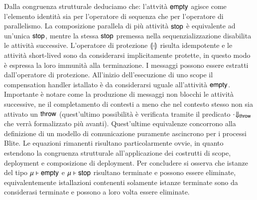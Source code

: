 Dalla congruenza strutturale deduciamo che: l'attvità ${\sf empty}$ agisce come
l'elemento identità sia per l'operatore di sequenza che per l'operatore di
parallelismo. La composizione parallela di più attività ${\sf stop}$ è equivalente ad
un'unica ${\sf stop}$, mentre la stessa ${\sf stop}$ premessa nella sequenzializzazione
disabilita le attività successive. L'operatore di protezione $\llparenthesis \cdot\rrparenthesis$
risulta idempotente e le attività short-lived sono da considerarsi implicitamente
protette, in questo modo è espressa la loro immunità alla terminazione. I
messaggi possono essere estratti dall'operatore di protezione.
All'inizio dell'esecuzione di uno scope il compensation handler istallato è da
considerarsi uguale all'attività ${\sf empty}$. Importante è notare come la
produzione di messaggi non blocchi le attività successive, ne il completamento
di contesti a meno che nel contesto stesso non sia attivato un ${\sf throw}$
(quest'ultimo possibilità è verificata tramite il predicato ${\sf \cdot}\!\Downarrow_{{\sf throw}}$ che
verrà formalizzato più avanti). Quest'ultime equivalenze concorrono alla
definizione di un modello di comunicazione puramente ascincrono per i processi
Blite. Le equazioni rimanenti risultano particolarmente ovvie, in quanto
estendono la congruenza strutturale all'applicazione dei costrutti di scope,
deployment e composizione di deployment. Per concludere si osserva che istanze
del tipo ${\sf \mu} \vdash {\sf empty}$ e ${\sf \mu} \vdash {\sf stop}$ risultano
terminate e possono essere eliminate, equivalentemente istallazioni contenenti
solamente istanze terminate sono da considerasi terminate e possono a loro
volta essere eliminate.
\\


